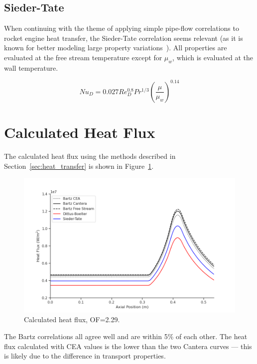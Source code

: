 \documentclass[11pt]{article}
\begin{document}
\subsection{Sieder-Tate}

When continuing with the theme of applying simple pipe-flow correlations to rocket engine heat transfer, the Sieder-Tate correlation seems relevant (as it is known for better modeling large property variations~\cite{bergman_fundamentals_2017}). All properties are evaluated at the free stream temperature except for $\mu_w$, which is evaluated at the wall temperature.

\begin{equation}
  Nu_{D} = 0.027 Re_{D}^{0.8} Pr^{1/3} \left( \frac{\mu}{\mu_w} \right)^{0.14}
\end{equation}

\section{Calculated Heat Flux}

The calculated heat flux using the methods described in Section~\ref{sec:heat_transfer} is shown in Figure~\ref{fig:heat_flux}.

\begin{figure}[H]
  \centering
  \includegraphics[width=\linewidth]{Heat_Flux.png}
  \caption{Calculated heat flux, OF=2.29.}
  \label{fig:heat_flux}
\end{figure}

The Bartz correlations all agree well and are within 5\% of each other. The heat flux calculated with CEA values is the lower than the two Cantera curves --- this is likely due to the difference in transport properties.
\end{document}
